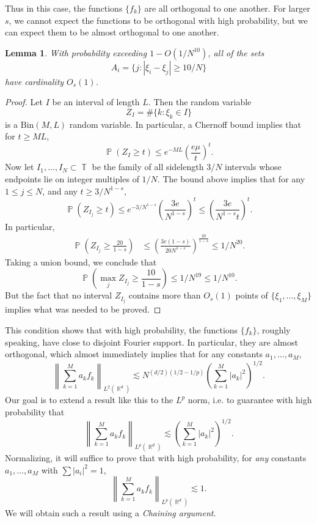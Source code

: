 \documentclass[dvipsnames,letterpaper,12pt]{article}
\numberwithin{equation}{section}
\DeclareMathOperator{\RR}{\mathbb{R}}
\DeclareMathOperator{\TT}{\mathbb{T}}
\newtheorem{lemma}[theorem]{Lemma}
\numberwithin{theorem}{section}
\DeclareMathOperator{\PP}{\mathbb{P}}
\begin{document}
Thus in this case, the functions $\{ f_k \}$ are all orthogonal to one another. For larger $s$, we cannot expect the functions to be orthogonal with high probability, but we can expect them to be almost orthogonal to one another.

\begin{lemma}
    With probability exceeding $1 - O(1/N^{10})$, all of the sets
    \[ A_i = \{ j : |\xi_i - \xi_j| \geq 10/N \} \]
    have cardinality $O_s(1)$.
\end{lemma}
\begin{proof}
    Let $I$ be an interval of length $L$. Then the random variable
    \[ Z_I = \# \{ k: \xi_k \in I \} \]
    is a $\text{Bin}(M,L)$ random variable. In particular, a Chernoff bound implies that for $t \geq ML$,
    \[ \PP( Z_I \geq t ) \leq e^{-ML} \left( \frac{e \mu}{t} \right)^t. \]
    Now let $I_1,\dots,I_N \subset \TT$ be the family of all sidelength $3/N$ intervals whose endpoints lie on integer multiples of $1/N$. The bound above implies that for any $1 \leq j \leq N$, and any $t \geq 3/N^{1-s}$,
    \[ \PP( Z_{I_j} \geq t ) \leq e^{-3/N^{1-s}} \left( \frac{3e}{N^{1-s}} \right)^t \leq \left( \frac{3e}{N^{1-s} t} \right)^t. \]
    In particular,
    \begin{align*}
        \PP \left(Z_{I_j} \geq \frac{20}{1 - s} \right) &\leq \left( \frac{3e(1-s)}{20 N^{1-s}} \right)^{\frac{20}{1-s}} \leq 1/N^{20}.
    \end{align*}
    Taking a union bound, we conclude that
    \[ \PP \left( \max_j Z_{I_j} \geq \frac{10}{1-s} \right) \leq 1/N^{19} \leq 1/N^{10}. \]
    But the fact that no interval $Z_{I_j}$ contains more than $O_s(1)$ points of $\{ \xi_1,\dots, \xi_M \}$ implies what was needed to be proved.
\end{proof}

This condition shows that with high probability, the functions $\{ f_k \}$, roughly speaking, have close to disjoint Fourier support. In particular, they are almost orthogonal, which almost immediately implies that for any constants $a_1,\dots,a_M$,
%
\[ \left\| \sum_{k = 1}^M a_k f_k \right\|_{L^2(\RR^d)} \lesssim N^{(d/2)(1/2 - 1/p)} \left( \sum_{k = 1}^M |a_k|^2 \right)^{1/2}. \]
%
Our goal is to extend a result like this to the $L^p$ norm, i.e. to guarantee with high probability that
%
\[ \left\| \sum_{k = 1}^M a_k f_k \right\|_{L^p(\RR^d)} \lesssim \left( \sum_{k = 1}^M |a_k|^2 \right)^{1/2}. \]
%
Normalizing, it will suffice to prove that with high probability, for \emph{any} constants $a_1,\dots,a_M$ with $\sum |a_i|^2 = 1$,
%
\[ \left\| \sum_{k = 1}^M a_k f_k \right\|_{L^p(\RR^d)} \lesssim 1. \]
%
We will obtain such a result using a \emph{Chaining argument}. 
\end{document}
